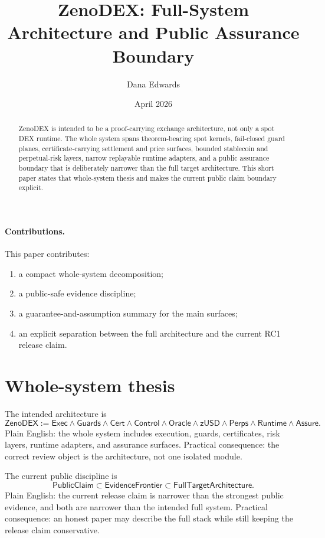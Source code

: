 \documentclass[9pt]{extarticle}
\title{ZenoDEX: Full-System Architecture and Public Assurance Boundary}
\author{Dana Edwards}
\date{April 2026}
\newcommand{\Exec}{\mathsf{Exec}}
\newcommand{\Guards}{\mathsf{Guards}}
\newcommand{\Cert}{\mathsf{Cert}}
\newcommand{\Runtime}{\mathsf{Runtime}}
\newcommand{\Assure}{\mathsf{Assure}}
\begin{document}
\maketitle

\begin{abstract}
ZenoDEX is intended to be a proof-carrying exchange architecture, not only a
spot DEX runtime. The whole system spans theorem-bearing spot kernels,
fail-closed guard planes, certificate-carrying settlement and price surfaces,
bounded stablecoin and perpetual-risk layers, narrow replayable runtime
adapters, and a public assurance boundary that is deliberately narrower than the
full target architecture. This short paper states that whole-system thesis and
makes the current public claim boundary explicit.
\end{abstract}

\paragraph{Contributions.}
This paper contributes:
\begin{enumerate}
  \item a compact whole-system decomposition;
  \item a public-safe evidence discipline;
  \item a guarantee-and-assumption summary for the main surfaces;
  \item an explicit separation between the full architecture and the current
  RC1 release claim.
\end{enumerate}

\section{Whole-system thesis}
The intended architecture is
\[
\mathsf{ZenoDEX}
:= \Exec \wedge \Guards \wedge \Cert \wedge \mathsf{Control}
\wedge \mathsf{Oracle} \wedge \mathsf{zUSD} \wedge \mathsf{Perps}
\wedge \Runtime \wedge \Assure.
\]
Plain English: the whole system includes execution, guards, certificates,
risk layers, runtime adapters, and assurance surfaces.
Practical consequence: the correct review object is the architecture, not one
isolated module.

The current public discipline is
\[
\mathsf{PublicClaim} \subset \mathsf{EvidenceFrontier} \subset \mathsf{FullTargetArchitecture}.
\]
Plain English: the current release claim is narrower than the strongest
public evidence, and both are narrower than the intended full system.
Practical consequence: an honest paper may describe the full stack while still
keeping the release claim conservative.
\end{document}
